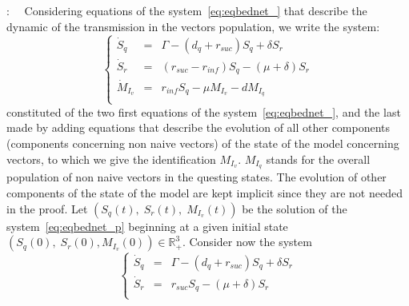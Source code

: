 \documentclass[a4paper]{article}
\newcommand{\varphiVar}{r_{inf}}
\newcommand{\varpiVar}{r_{suc}}
\newcommand{\hatmuVar}{d_q}
\begin{document}
:~~
Considering equations of the  system~\eqref{eq:eqbednet_} that describe the dynamic of the transmission in the vectors population, we write the system:  
%
\begin{equation}
\left\{
\begin{array}{lcl}
\dot S_q & = &\Gamma- (\hatmuVar +\varpiVar ) S_q+\delta S_r\\%
\dot S_r & = & (\varpiVar -\varphiVar ) S_q-(\mu+\delta)S_r\\%
\dot M_{I_v} & = & \varphiVar   S_q - \mu M_{I_v} - dM_{I_q}\\%
\end{array}
\right. 
\label{eq:eqbednet_p}
\end{equation} 
constituted of the two first equations of the system~\eqref{eq:eqbednet_}, and the last made by adding equations that describe the evolution of all other components (components concerning non naive vectors) of the state of the model concerning vectors, to which we give the identification $M_{I_v}$.  $M_{I_q}$ stands  for the overall population of non naive vectors in the questing states. The evolution of other components of the state of the model are kept implicit since they are not needed in the proof.  Let $\left(S_q(t),\;S_r(t),\; M_{I_v}(t)\right)$ be the solution of the system~\eqref{eq:eqbednet_p} beginning at a given initial state $(S_q(0),\;S_r(0),M_{I_v}(0))\in\mathbb R^3_+$. Consider now the system
\begin{equation}
\left\{
\begin{array}{lcl}
\dot S_q & = &\Gamma- (\hatmuVar +\varpiVar ) S_q+\delta S_r\\%
\dot S_r & = & \varpiVar  S_q-(\mu+\delta)S_r\\%
\end{array}
\right. 
\label{eq:eqbednet_pu}
\end{equation} 
\end{document}
